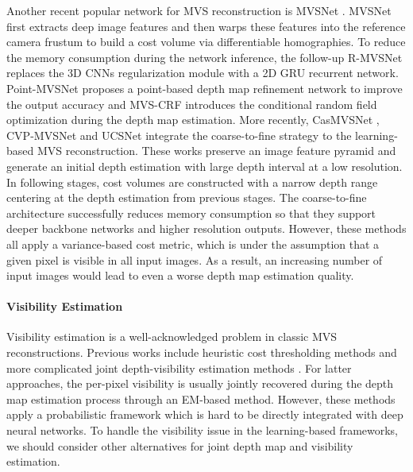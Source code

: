 \documentclass{bmvc2k}
\begin{document}
Another recent popular network for MVS reconstruction is MVSNet \cite{yao2018mvsnet}. MVSNet first extracts deep image features and then warps these features into the reference camera frustum to build a cost volume via differentiable homographies. To reduce the memory consumption during the network inference, the follow-up R-MVSNet \cite{yao2019recurrent} replaces the 3D CNNs regularization module with a 2D GRU recurrent network. 
Point-MVSNet \cite{chen2019point} proposes a point-based depth map refinement network to improve the output accuracy and MVS-CRF \cite{xue2019mvscrf} introduces the conditional
random field optimization during the depth map estimation. More recently, CasMVSNet \cite{gu2020cascade}, CVP-MVSNet \cite{yang2020cost} and UCSNet \cite{cheng2020deep} integrate the coarse-to-fine strategy to the learning-based MVS reconstruction. These works preserve an image feature pyramid and generate an initial depth estimation with large depth interval at a low resolution. In following stages, cost volumes are constructed with a narrow depth range centering at the depth estimation from previous stages. The coarse-to-fine architecture successfully reduces memory consumption so that they support deeper backbone networks and higher resolution outputs. However, these methods all apply a variance-based cost metric, which is under the assumption that a given pixel is visible in all input images. As a result, an increasing number of input images would lead to even a worse depth map estimation quality.

\vspace{-5mm}\paragraph{Visibility Estimation}
Visibility estimation is a well-acknowledged problem in classic MVS reconstructions. Previous works include heuristic cost thresholding methods \cite{furukawa2009accurate,tola2012efficient,xu2019multi} and more complicated joint depth-visibility estimation methods \cite{zheng2014patchmatch, schonberger2016pixelwise}. For latter approaches, the per-pixel visibility is usually jointly recovered during the depth map estimation process through an EM-based method. However, these methods apply a probabilistic framework which is hard to be directly integrated with deep neural networks. To handle the visibility issue in the learning-based frameworks, we should consider other alternatives for joint depth map and visibility estimation.
\end{document}
